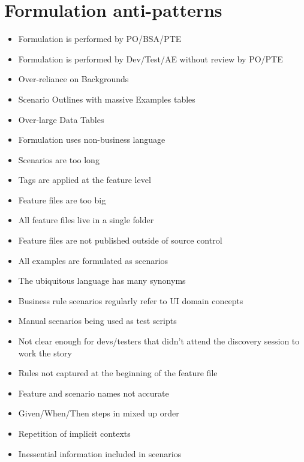 \chapter*{Formulation anti-patterns}

\ifnotes

\fi

\ifcontent


    \begin{itemize}
        \item Formulation is performed by PO/BSA/PTE
        \item Formulation is performed by Dev/Test/AE without review by PO/PTE
        \item Over-reliance on Backgrounds
        \item Scenario Outlines with massive Examples tables
        \item Over-large Data Tables
        \item Formulation uses non-business language
        \item Scenarios are too long
        \item Tags are applied at the feature level
        \item Feature files are too big
        \item All feature files live in a single folder
        \item Feature files are not published outside of source control
        \item All examples are formulated as scenarios
        \item The ubiquitous language has many synonyms
        \item Business rule scenarios regularly refer to UI domain concepts 
        \item Manual scenarios being used as test scripts
        \item Not clear enough for devs/testers that didn't attend the discovery session to work the story
        \item Rules not captured at the beginning of the feature file
        \item Feature and scenario names not accurate
        \item Given/When/Then steps in mixed up order
        \item Repetition of implicit contexts
        \item Inessential information included in scenarios
    \end{itemize}



\fi